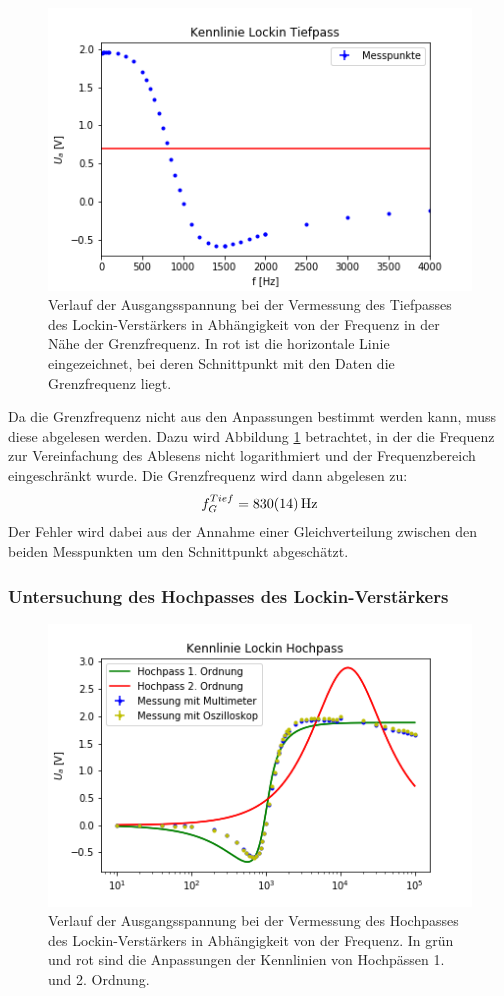 \documentclass[12pt,a4paper]{article}
\begin{document}
\begin{figure}
\centering
\includegraphics[scale=1]{Bilder/Vorversuch2/AblesenTiefpass.png}
\caption[test]{Verlauf der Ausgangsspannung bei der Vermessung des Tiefpasses des Lockin-Verstärkers in Abhängigkeit von der Frequenz in der Nähe der Grenzfrequenz. In rot ist die horizontale Linie eingezeichnet, bei deren Schnittpunkt mit den Daten die Grenzfrequenz liegt.}
\label{fig:LockinTiefpass_Ablesen}
\end{figure}

Da die Grenzfrequenz nicht aus den Anpassungen bestimmt werden kann, muss diese abgelesen werden. Dazu wird Abbildung \ref{fig:LockinTiefpass_Ablesen} betrachtet, in der die Frequenz zur Vereinfachung des Ablesens nicht logarithmiert und der Frequenzbereich eingeschränkt wurde. Die Grenzfrequenz wird dann abgelesen zu:
\begin{equation*}
f_G^{Tief} = \SI{830 \pm 14}{Hz}
\end{equation*}
Der Fehler wird dabei aus der Annahme einer Gleichverteilung zwischen den beiden Messpunkten um den Schnittpunkt abgeschätzt.

\subsubsection{Untersuchung des Hochpasses des Lockin-Verstärkers}

\begin{figure}
\centering
\includegraphics[scale=1]{Bilder/Vorversuch2/KennlinieHochpass.png}
\caption[test]{Verlauf der Ausgangsspannung bei der Vermessung des Hochpasses des Lockin-Verstärkers in Abhängigkeit von der Frequenz. In grün und rot sind die Anpassungen der Kennlinien von Hochpässen 1. und 2. Ordnung.}
\label{fig:LockinHochpass_Verlauf}
\end{figure}
\end{document}
